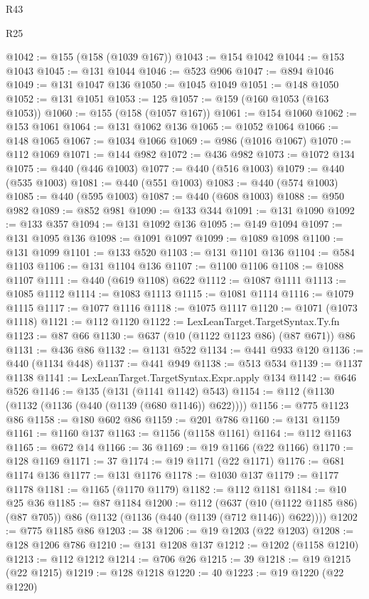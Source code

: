 \begin{lexlean}{R43}
\begin{lexlean}{R25}
\begin{coremodule}
{{{{{{{{{{{{{{{{{{{{{{{{{{{{{{{{{{{{{{{{{{{{{{{{{{{{{{{{{{{{{{{{{{{{{{{{{{{{{{{{{{{{{{{{{{{{{{{{{{{{{{{{{{{{{{{{{{{{{{{{{{{{{{{{{{{{{{{{{{{{{{{{{{{{{{{{{{{{{{{{{{{{{{{{{{{{{{{{{{{{{{{{{{{{{{{{{@1042 := @155 (@158 (@1039 @167))
@1043 := @154 @1042
@1044 := @153 @1043
@1045 := @131 @1044
@1046 := @523 @906
@1047 := @894 @1046
@1049 := @131 @1047 @136
@1050 := @1045 @1049
@1051 := @148 @1050
@1052 := @131 @1051
@1053 := 125
@1057 := @159 (@160 @1053 (@163 @1053))
@1060 := @155 (@158 (@1057 @167))
@1061 := @154 @1060
@1062 := @153 @1061
@1064 := @131 @1062 @136
@1065 := @1052 @1064
@1066 := @148 @1065
@1067 := @1034 @1066
@1069 := @986 (@1016 @1067)
@1070 := @112 @1069
@1071 := @144 @982
@1072 := @436 @982
@1073 := @1072 @134
@1075 := @440 (@446 @1003)
@1077 := @440 (@516 @1003)
@1079 := @440 (@535 @1003)
@1081 := @440 (@551 @1003)
@1083 := @440 (@574 @1003)
@1085 := @440 (@595 @1003)
@1087 := @440 (@608 @1003)
@1088 := @950 @982
@1089 := @852 @981
@1090 := @133 @344
@1091 := @131 @1090
@1092 := @133 @357
@1094 := @131 @1092 @136
@1095 := @149 @1094
@1097 := @131 @1095 @136
@1098 := @1091 @1097
@1099 := @1089 @1098
@1100 := @131 @1099
@1101 := @133 @520
@1103 := @131 @1101 @136
@1104 := @584 @1103
@1106 := @131 @1104 @136
@1107 := @1100 @1106
@1108 := @1088 @1107
@1111 := @440 (@619 @1108) @622
@1112 := @1087 @1111
@1113 := @1085 @1112
@1114 := @1083 @1113
@1115 := @1081 @1114
@1116 := @1079 @1115
@1117 := @1077 @1116
@1118 := @1075 @1117
@1120 := @1071 (@1073 @1118)
@1121 := @112 @1120
@1122 := LexLeanTarget.TargetSyntax.Ty.fn
@1123 := @87 @66
@1130 := @637 (@10 (@1122 @1123 @86) (@87 @671)) @86
@1131 := @436 @86
@1132 := @1131 @522
@1134 := @441 @933 @120
@1136 := @440 (@1134 @448)
@1137 := @441 @949
@1138 := @513 @534
@1139 := @1137 @1138
@1141 := LexLeanTarget.TargetSyntax.Expr.apply @134
@1142 := @646 @526
@1146 := @135 (@131 (@1141 @1142) @543)
@1154 := @112 (@1130 (@1132 (@1136 (@440 (@1139 (@680 @1146)) @622))))
@1156 := @775 @1123 @86
@1158 := @180 @602 @86
@1159 := @201 @786
@1160 := @131 @1159
@1161 := @1160 @137
@1163 := @1156 (@1158 @1161)
@1164 := @112 @1163
@1165 := @672 @14
@1166 := 36
@1169 := @19 @1166 (@22 @1166)
@1170 := @128 @1169
@1171 := 37
@1174 := @19 @1171 (@22 @1171)
@1176 := @681 @1174 @136
@1177 := @131 @1176
@1178 := @1030 @137
@1179 := @1177 @1178
@1181 := @1165 (@1170 @1179)
@1182 := @112 @1181
@1184 := @10 @25 @36
@1185 := @87 @1184
@1200 := @112
    (@637 (@10 (@1122 @1185 @86) (@87 @705)) @86 (@1132 (@1136 (@440 (@1139 (@712 @1146)) @622))))
@1202 := @775 @1185 @86
@1203 := 38
@1206 := @19 @1203 (@22 @1203)
@1208 := @128 @1206 @786
@1210 := @131 @1208 @137
@1212 := @1202 (@1158 @1210)
@1213 := @112 @1212
@1214 := @706 @26
@1215 := 39
@1218 := @19 @1215 (@22 @1215)
@1219 := @128 @1218
@1220 := 40
@1223 := @19 @1220 (@22 @1220)
}}}}}}}}}}}}}}}}}}}}}}}}}}}}}}}}}}}}}}}}}}}}}}}}}}}}}}}}}}}}}}}}}}}}}}}}}}}}}}}}}}}}}}}}}}}}}}}}}}}}}}}}}}}}}}}}}}}}}}}}}}}}}}}}}}}}}}}}}}}}}}}}}}}}}}}}}}}}}}}}}}}}}}}}}}}}}}}}}}}}}}}}}}}}}}}}}
\end{coremodule}
\end{lexlean}
\end{lexlean}
